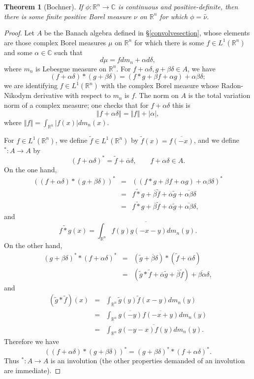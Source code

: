 \documentclass{article}
\newcommand{\norm}[1]{\left\Vert #1 \right\Vert}
\newtheorem{theorem}{Theorem}
\theoremstyle{definition}
\begin{document}
\begin{theorem}[Bochner]
If $\phi:\mathbb{R}^n \to \mathbb{C}$ is continuous and positive-definite, then there is some finite
positive Borel measure $\nu$ on $\mathbb{R}^n$ for which $\phi=\hat{\nu}$.
\end{theorem}
\begin{proof}
Let $A$ be the Banach algebra defined in \S \ref{convolvesection}, whose elements  are those complex Borel measures $\mu$
on $\mathbb{R}^n$ for which there is some $f \in L^1(\mathbb{R}^n)$ and some $\alpha \in \mathbb{C}$ such that
\[
d\mu = f dm_n + \alpha d\delta,
\]
where $m_n$ is Lebesgue measure on $\mathbb{R}^n$. For $f+\alpha \delta, g+\beta \delta \in A$, we have
\[
(f+\alpha \delta) * (g+\beta \delta) = (f *g + \beta f + \alpha g) + \alpha \beta \delta;
\]
we are identifying $f \in L^1(\mathbb{R}^n)$ with the complex Borel measure whose Radon-Nikodym
derivative with respect to $m_n$ is $f$. The norm on $A$ is the total variation norm of a complex measure; one checks that for $f+\alpha \delta$ this is
\[
\norm{f+\alpha \delta}=\norm{f}+|\alpha|,
\]
 where $\norm{f}=\int_{\mathbb{R}^n} |f(x)| dm_n(x)$.

For $f \in L^1(\mathbb{R}^n)$, we define $\widetilde{f} \in L^1(\mathbb{R}^n)$ by $\widetilde{f}(x)=\overline{f(-x)}$, 
and we define $^*:A \to A$ by 
\[
(f+\alpha \delta)^* = \widetilde{f}+\overline{\alpha}\delta, \qquad f+\alpha \delta \in A.
\]
On the one hand,
\begin{eqnarray*}
((f+\alpha\delta)*(g+\beta \delta))^*&=&( (f *g + \beta f + \alpha g) + \alpha \beta \delta)^*\\
&=&\widetilde{f*g} + \overline{\beta} \widetilde{f} + \overline{\alpha} \widetilde{g} + \overline{\alpha \beta} \delta\\
&=&\widetilde{f*g} +  \overline{\beta} \widetilde{f} + \overline{\alpha} \widetilde{g} + \overline{\alpha \beta} \delta,
\end{eqnarray*}
and
\[
\widetilde{f*g}(x) = \overline{\int_{\mathbb{R}^n} f(y)g(-x-y) dm_n(y)}.
\]
On the other hand,
\begin{eqnarray*}
(g+\beta \delta)^* *(f+\alpha \delta)^* &=&(\widetilde{g}+\overline{\beta}\delta)*(\widetilde{f}+\overline{\alpha}\delta)\\
&=&(\widetilde{g}*\widetilde{f} +\overline{\alpha} \widetilde{g}+\overline{\beta} \widetilde{f}) +\overline{\beta \alpha}
\delta,
\end{eqnarray*}
and
\begin{eqnarray*}
(\widetilde{g}*\widetilde{f})(x)&=&\int_{\mathbb{R}^n} \widetilde{g}(y) \widetilde{f}(x-y) dm_n(y)\\
&=&\int_{\mathbb{R}^n} \overline{g(-y)} \overline{f(-x+y)} dm_n(y)\\
&=&\overline{\int_{\mathbb{R}^n} g(-y-x) f(y) dm_n(y)}.
\end{eqnarray*}
Therefore we have
\[
((f+\alpha\delta)*(g+\beta \delta))^* = (g+\beta \delta)^* *(f+\alpha \delta)^*.
\]
Thus $^*:A \to A$ is an involution (the other properties demanded of an involution are immediate).


\end{proof}
\end{document}
